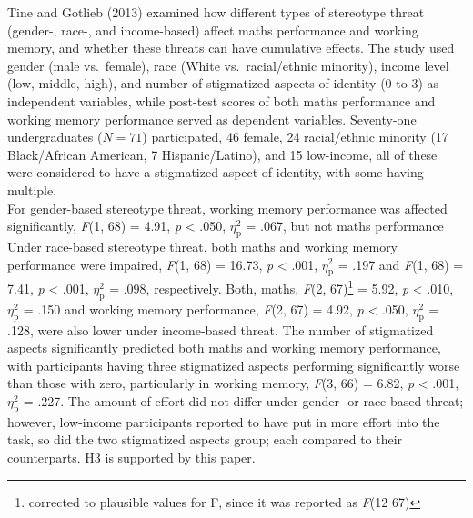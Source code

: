 \documentclass[
  stu, a4paper,floatsintext]{apa7}
\begin{document}
Tine and Gotlieb (2013) examined how different types of stereotype threat (gender-, race-, and income-based) affect maths performance and working memory, and whether these threats can have cumulative effects.
The study used gender (male vs.~female), race (White vs.~racial/ethnic minority), income level (low, middle, high), and number of stigmatized aspects of identity (0 to 3) as independent variables, while post-test scores of both maths performance and working memory performance served as dependent variables.
Seventy-one undergraduates (\(N=71\)) participated, 46 female, 24 racial/ethnic minority (17 Black/African American, 7 Hispanic/Latino), and 15 low-income, all of these were considered to have a stigmatized aspect of identity, with some having multiple.\\
For gender-based stereotype threat, working memory performance was affected significantly, \emph{F}(1, 68) = 4.91, \emph{p} \textless{} .050, \(\eta^{2}_{\text{p}}\) = .067, but not maths performance
Under race-based stereotype threat, both maths and working memory performance were impaired, \emph{F}(1, 68) = 16.73, \emph{p} \textless{} .001, \(\eta^{2}_{\text{p}}\) = .197 and \emph{F}(1, 68) = 7.41, \emph{p} \textless{} .001, \(\eta^{2}_{\text{p}}\) = .098, respectively.
Both, maths, \emph{F}(2, 67)\footnote{corrected to plausible values for F, since it was reported as \emph{F}(12 67)} = 5.92, \emph{p} \textless{} .010, \(\eta^{2}_{\text{p}}\) = .150 and working memory performance, \emph{F}(2, 67) = 4.92, \emph{p} \textless{} .050, \(\eta^{2}_{\text{p}}\) = .128, were also lower under income-based threat.
The number of stigmatized aspects significantly predicted both maths and working memory performance, with participants having three stigmatized aspects performing significantly worse than those with zero, particularly in working memory, \emph{F}(3, 66) = 6.82, \emph{p} \textless{} .001, \(\eta^{2}_{\text{p}}\) = .227.
The amount of effort did not differ under gender- or race-based threat; however, low-income participants reported to have put in more effort into the task, so did the two stigmatized aspects group; each compared to their counterparts.
H3 is supported by this paper.
\end{document}
